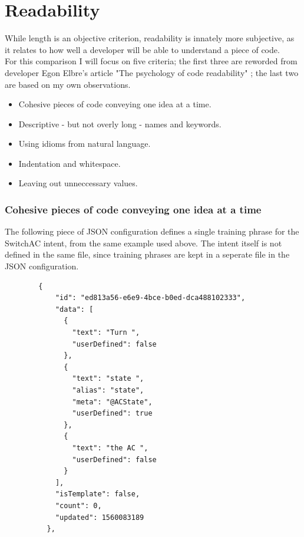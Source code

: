 \section{Readability}

While length is an objective criterion, readability is innately more subjective, as it relates to how well a developer will be able to understand a piece of code.\\
For this comparison I will focus on five criteria; the first three are reworded from developer Egon Elbre's article "The psychology of code readability" \cite{Elbre}; the last two are based on my own observations.
\begin{itemize}
    \item Cohesive pieces of code conveying one idea at a time.
    \item Descriptive - but not overly long - names and keywords.
    \item Using idioms from natural language.
    \item Indentation and whitespace.
    \item Leaving out unneccessary values.
\end{itemize}

\subsubsection{Cohesive pieces of code conveying one idea at a time}

The following piece of JSON configuration defines a single training phrase for the SwitchAC intent, from the same example used above. The intent itself is not defined in the same file, since training phrases are kept in a seperate file in the JSON configuration.
\begin{samepage}
    \begin{lstlisting}
        {
            "id": "ed813a56-e6e9-4bce-b0ed-dca488102333",
            "data": [
              {
                "text": "Turn ",
                "userDefined": false
              },
              {
                "text": "state ",
                "alias": "state",
                "meta": "@ACState",
                "userDefined": true
              },
              {
                "text": "the AC ",
                "userDefined": false
              }
            ],
            "isTemplate": false,
            "count": 0,
            "updated": 1560083189
          },
    \end{lstlisting}
\end{samepage}

